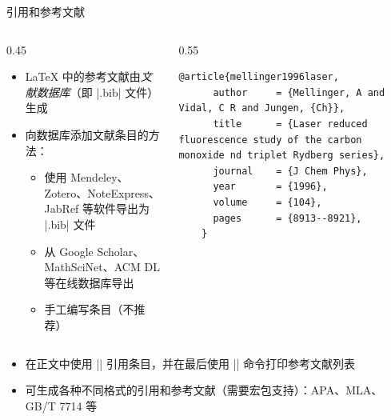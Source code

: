     \begin{frame}[fragile]{引用和参考文献}
      \begin{columns}
        \begin{column}{0.45\textwidth}
          \begin{itemize}
            \item \LaTeX{} 中的参考文献由\emph{文献数据库}（即 |.bib| 文件）生成
            \item 向数据库添加文献条目的方法：
              \begin{itemize}
                \item 使用 Mendeley、Zotero、NoteExpress、JabRef 等软件导出为 |.bib| 文件
                \item 从 Google Scholar、MathSciNet、ACM DL 等在线数据库导出
                \item 手工编写条目（不推荐）
              \end{itemize}
          \end{itemize}
        \end{column}
        \begin{column}{0.55\textwidth}
          \begin{lstlisting}[basicstyle=\footnotesize\ttfamily]
    @article{mellinger1996laser,
      author     = {Mellinger, A and Vidal, C R and Jungen, {Ch}},
      title      = {Laser reduced fluorescence study of the carbon monoxide nd triplet Rydberg series},
      journal    = {J Chem Phys},
      year       = {1996},
      volume     = {104},
      pages      = {8913--8921},
    }
            \end{lstlisting}
        \end{column}
      \end{columns}
      \begin{itemize}
        \item 在正文中使用 |\cite{key1, key2}| 引用条目，并在最后使用 || 命令打印参考文献列表
        \item \BibTeX{} 可生成各种不同格式的引用和参考文献（需要宏包支持）：APA、MLA、GB/T 7714 等
        \end{itemize}
    \end{frame}

